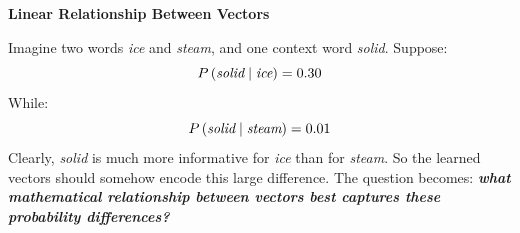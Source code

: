\highspace
\begin{flushleft}
    \textcolor{Green3}{ \textbf{Linear Relationship Between Vectors}}
\end{flushleft}
Imagine two words \emph{ice} and \emph{steam}, and one context word \emph{solid}. Suppose:
\begin{equation*}
    P\left(\emph{solid} \mid \emph{ice}\right) = 0.30
\end{equation*}
While:
\begin{equation*}
    P\left(\emph{solid} \mid \emph{steam}\right) = 0.01
\end{equation*}
Clearly, \emph{solid} is much more informative for \emph{ice} than for \emph{steam}. So the learned vectors should somehow encode this large difference. The question becomes: \emph{\textbf{what mathematical relationship between vectors best captures these probability differences?}}

